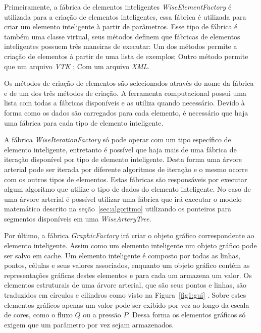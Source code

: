 \documentclass[a4paper,12pt]{monografia}
\theoremstyle{plain}
\theoremstyle{definition}
\theoremstyle{remark}
\begin{document}
Primeiramente, a fábrica de elementos inteligentes \textit{WiseElementFactory} é utilizada para a criação de elementos inteligentes, essa fábrica é utilizada para criar um elemento inteligente à partir de parâmetros. Esse tipo de fábrica é também uma classe virtual, seus métodos definem que fábricas de elementos inteligentes possuem três maneiras de executar: Um dos métodos permite a criação de elementos à partir de uma lista de exemplos; Outro método permite que um arquivo \textit{VTK} ; Com um arquivo \textit{XML}. 

Os métodos de criação de elementos são selecionados através do nome da fábrica e de um dos três métodos de criação. A ferramenta computacional possui uma lista com todas a fábricas disponíveis e as utiliza quando necessário. Devido à forma como os dados são carregados para cada elemento, é necessário que haja uma fábrica para cada tipo de elemento inteligente.

A fábrica \textit{WiseIterationFactory} só pode operar com um tipo específico de elemento inteligente, entretanto é possível que haja mais de uma fábrica de iteração disponível por tipo de elemento inteligente. Desta forma uma árvore arterial pode ser iterada por diferente algoritmos de iteração e o mesmo ocorre com os outros tipos de elementos. Estas fábricas são responsáveis por executar algum algoritmo que utilize o tipo de dados do elemento inteligente. No caso de uma árvore arterial é possível utilizar uma fábrica que irá executar o modelo matemático descrito na seção~\ref{sec:algoritmo} utilizando os ponteiros para segmentos disponíveis em uma \textit{WiseArteryTree}.

Por último, a fábrica \textit{GraphicFactory} irá criar o objeto gráfico correspondente ao elemento inteligente. Assim como um elemento inteligente um objeto gráfico pode ser salvo em cache.  Um elemento inteligente é composto por todas as linhas, pontos, células e seus valores associados, enquanto um objeto gráfico contém as representações gráficas destes elementos e para cada um armazena um valor. Os elementos estruturais de uma árvore arterial, que são seus pontos e linhas, são traduzidos em círculos e cilindros como visto na Figura~\ref{fig1:gui} . Sobre estes elementos gráficos apenas um valor pode ser exibido por vez ao longo da escala de cores, como o fluxo $Q$ ou a pressão $P$. Dessa forma os elementos gráficos só exigem que um parâmetro por vez sejam armazenados.


\end{document}
